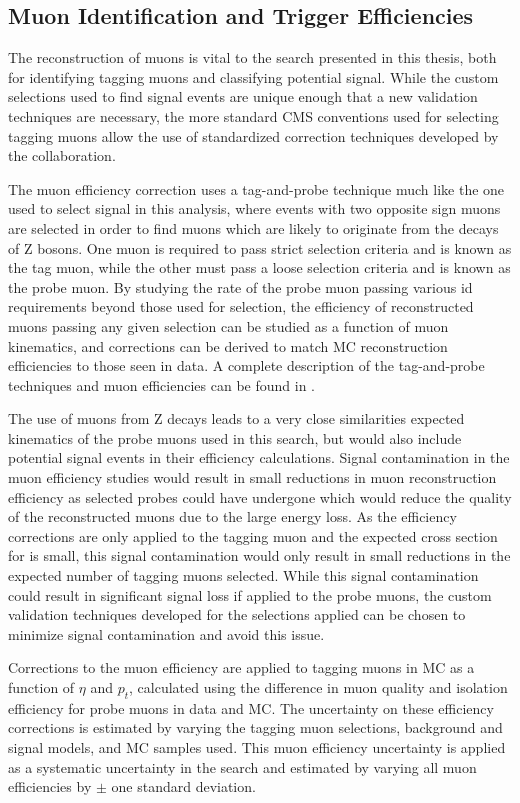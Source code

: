 \subsection{Muon Identification and Trigger Efficiencies}
The reconstruction of muons is vital to the search presented in this thesis, both for identifying tagging muons and classifying potential signal.
While the custom selections used to find signal events are unique enough that a new validation techniques are necessary, the more standard CMS conventions used for selecting tagging muons allow the use of standardized correction techniques developed by the collaboration.

The muon efficiency correction uses a tag-and-probe technique much like the one used to select signal in this analysis, where events with two opposite sign muons are selected in order to find muons which are likely to originate from the decays of Z bosons.
One muon is required to pass strict selection criteria and is known as the tag muon, while the other must pass a loose selection criteria and is known as the probe muon.
By studying the rate of the probe muon passing various id requirements beyond those used for selection, the efficiency of reconstructed muons passing any given selection can be studied as a function of muon kinematics, and corrections can be derived to match MC reconstruction efficiencies to those seen in data. 
A complete description of the tag-and-probe techniques and muon efficiencies can be found in \cite{Sirunyan2018}.

The use of muons from Z decays leads to a very close similarities expected kinematics of the probe muons used in this search, but would also include potential signal events in their efficiency calculations. 
Signal contamination in the muon efficiency studies would result in small reductions in muon reconstruction efficiency as selected probes could have undergone \dbrem which would reduce the quality of the reconstructed muons due to the large energy loss. 
As the efficiency corrections are only applied to the tagging muon and the expected cross section for \dbrem is small, this signal contamination would only result in small reductions in the expected number of tagging muons selected.
While this signal contamination could result in significant signal loss if applied to the probe muons, the custom validation techniques developed for the selections applied can be chosen to minimize signal contamination and avoid this issue.

Corrections to the muon efficiency are applied to tagging muons in MC as a function of $\eta$ and $p_t$, calculated using the difference in muon quality and isolation efficiency for probe muons in data and MC. 
The uncertainty on these efficiency corrections is estimated by varying the tagging muon selections, background and signal models, and MC samples used. 
This muon efficiency uncertainty is applied as a systematic uncertainty in the search and estimated by varying all muon efficiencies by $\pm$ one standard deviation.


